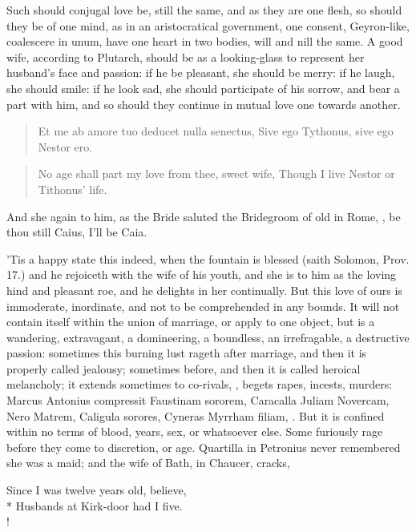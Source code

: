 Such should conjugal love be, still the same, and as they are one
flesh, so should they be of one mind, as in an aristocratical
government, one consent, Geyron-like, coalescere in unum, have
one heart in two bodies, will and nill the same. A good wife, according
to Plutarch, should be as a looking-glass to represent her husband's
face and passion: if he be pleasant, she should be merry: if he laugh,
she should smile: if he look sad, she should participate of his sorrow,
and bear a part with him, and so should they continue in mutual love
one towards another.

\begin{latin}
\begin{verse}%
Et me ab amore tuo deducet nulla senectus,
Sive ego Tythonus, sive ego Nestor ero.
\end{verse}%
\end{latin}
\translationrule%
\begin{verse}%
No age shall part my love from thee, sweet wife,
Though I live Nestor or Tithonus' life.
\end{verse}%

And she again to him, as the Bride saluted the Bridegroom of old
in Rome, , be thou still Caius, I'll be
Caia.

'Tis a happy state this indeed, when the fountain is blessed (saith
Solomon, Prov.  17.) and he rejoiceth with the wife of his youth, and
she is to him as the loving hind and pleasant roe, and he delights in
her continually. But this love of ours is immoderate, inordinate, and
not to be comprehended in any bounds. It will not contain itself within
the union of marriage, or apply to one object, but is a wandering,
extravagant, a domineering, a boundless, an irrefragable, a destructive
passion: sometimes this burning lust rageth after marriage, and then it
is properly called jealousy; sometimes before, and then it is called
heroical melancholy; it extends sometimes to co-rivals, \etc{}, begets
rapes, incests, murders: Marcus Antonius compressit Faustinam sororem,
Caracalla Juliam Novercam, Nero Matrem, Caligula sorores, Cyneras
Myrrham filiam, \etc{}. But it is confined within no terms of blood, years,
sex, or whatsoever else. Some furiously rage before they come to
discretion, or age. Quartilla in Petronius never remembered she
was a maid; and the wife of Bath, in Chaucer, cracks,
%
{\gothfont%
\begin{versewithlinenos}{2}{1}{1}%
Since I was twelve years old, believe,\\*
Husbands at Kirk-door had I five.\\!
\end{versewithlinenos}%
}%


